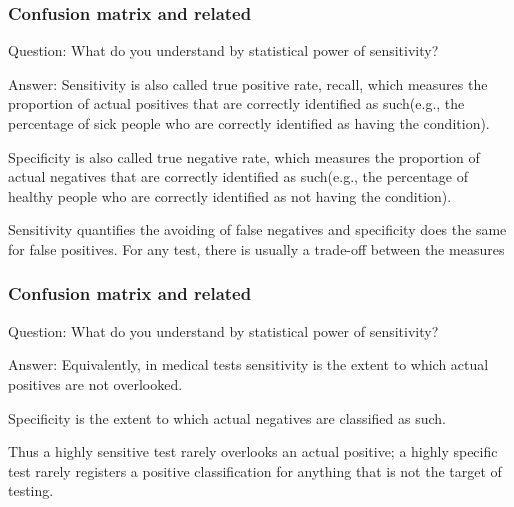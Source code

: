 \documentclass[11pt]{beamer}
\begin{document}
\begin{frame}
\frametitle{Confusion matrix and related}
\begin{block}{Question:}
	What do you understand by statistical power of sensitivity?
\end{block}
\begin{block}{Answer:}
	Sensitivity is also called true positive rate, recall, which measures the proportion of actual positives that are correctly identified as such(e.g., the percentage of sick people who are correctly identified as having the condition).
	
	Specificity is also called true negative rate, which measures the proportion of actual negatives that are correctly identified as such(e.g., the percentage of healthy people who are correctly identified as not having the condition).
	
	Sensitivity quantifies the avoiding of false negatives and specificity does the same for false positives. For any test, there is usually a trade-off between the measures
\end{block}
\end{frame}

\begin{frame}
\frametitle{Confusion matrix and related}
\begin{block}{Question:}
	What do you understand by statistical power of sensitivity?
\end{block}
\begin{block}{Answer:}
	Equivalently, in medical tests sensitivity is the extent to which actual positives are not overlooked.
	
	Specificity is the extent to which actual negatives are classified as such.
	
	Thus a highly sensitive test rarely overlooks an actual positive; a highly specific test rarely registers a positive classification for anything that is not the target of testing.
\end{block}
\end{frame}
\end{document}
